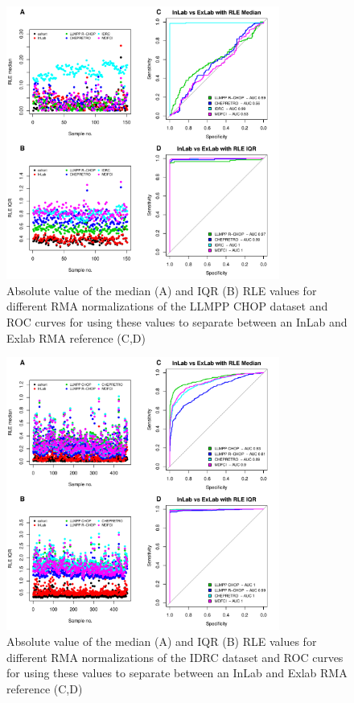 \begin{figure}[!h]
	\begin{center}
		\includegraphics[width=0.8\textwidth]{figures/CHOP_rle.pdf}
	\end{center}
	\caption{Absolute value of the median (A) and IQR (B) RLE values for different RMA normalizations of the LLMPP CHOP dataset and ROC curves for using these values to separate between an InLab and Exlab RMA reference (C,D)}
	\label{fig:chop_rle}
\end{figure}

\begin{figure}[!h]
	\begin{center}
		\includegraphics[width=0.8\textwidth]{figures/IDRC_rle.pdf}
	\end{center}
	\caption{Absolute value of the median (A) and IQR (B) RLE values for different RMA normalizations of the IDRC dataset and ROC curves for using these values to separate between an InLab and Exlab RMA reference (C,D)}
	\label{fig:idrc_rle}
\end{figure}

